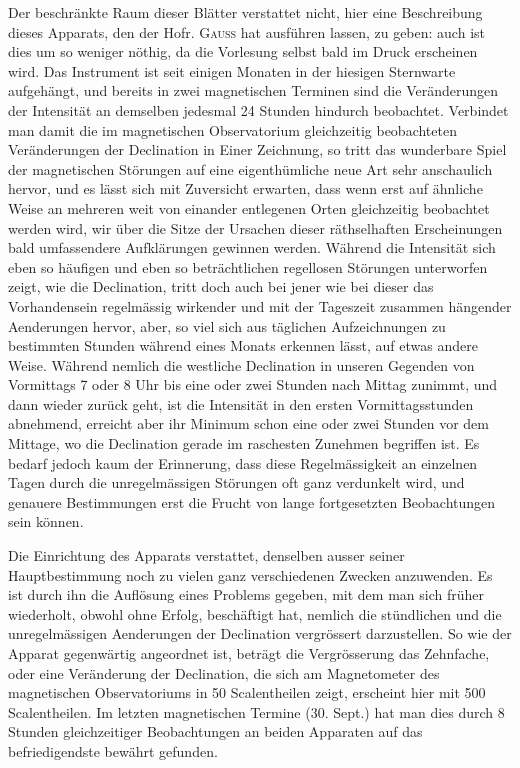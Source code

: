 Der beschränkte Raum dieser Blätter verstattet nicht, hier eine Beschreibung dieses Apparats, den der Hofr. \textsc{Gauss} hat ausführen lassen, zu geben: auch ist dies um so weniger nöthig, da die Vorlesung selbst bald im Druck erscheinen wird. Das Instrument ist seit einigen Monaten in der hiesigen Sternwarte aufgehängt, und bereits in zwei magnetischen Terminen sind die Veränderungen der Intensität an demselben jedesmal 24 Stunden hindurch beobachtet. Verbindet man damit die im magnetischen Observatorium gleichzeitig beobachteten Veränderungen der Declination in Einer Zeichnung, so tritt das wunderbare Spiel der magnetischen Störungen auf eine eigenthümliche neue Art sehr anschaulich hervor, und es lässt sich mit Zuversicht erwarten, dass wenn erst auf ähnliche Weise an mehreren weit von einander entlegenen Orten gleichzeitig beobachtet werden wird, wir über die Sitze der Ursachen dieser räthselhaften Erscheinungen bald umfassendere Aufklärungen gewinnen werden. Während die Intensität sich eben so häufigen und eben so beträchtlichen regellosen Störungen unterworfen zeigt, wie die Declination, tritt doch auch bei jener wie bei dieser das Vorhandensein regelmässig wirkender und mit der Tageszeit zusammen hängender Aenderungen hervor, aber, so viel sich aus täglichen Aufzeichnungen zu bestimmten Stunden während eines Monats erkennen lässt, auf etwas andere Weise. Während nemlich die westliche Declination in unseren Gegenden von Vormittags 7 oder 8 Uhr bis eine oder zwei Stunden nach Mittag zunimmt, und dann wieder zurück geht, ist die Intensität in den ersten Vormittagsstunden abnehmend, erreicht aber ihr Minimum schon eine oder zwei Stunden vor dem Mittage, wo die Declination gerade im raschesten Zunehmen begriffen ist. Es bedarf jedoch kaum der Erinnerung, dass diese Regelmässigkeit an einzelnen Tagen durch die unregelmässigen Störungen oft ganz verdunkelt wird, und genauere Bestimmungen erst die Frucht von lange fortgesetzten Beobachtungen sein können.

Die Einrichtung des Apparats verstattet, denselben ausser seiner Hauptbestimmung noch zu vielen ganz verschiedenen Zwecken anzuwenden. Es ist durch ihn die Auflösung eines Problems gegeben, mit dem man sich früher wiederholt, obwohl ohne Erfolg, beschäftigt hat, nemlich die stündlichen und die unregelmässigen Aenderungen der Declination vergrössert darzustellen. So wie der Apparat gegenwärtig angeordnet ist, beträgt die Vergrösserung das Zehnfache, oder eine Veränderung der Declination, die sich am Magnetometer des magnetischen Observatoriums in 50 Scalentheilen zeigt, erscheint hier mit 500 Scalentheilen. Im letzten magnetischen Termine (30. Sept.) hat man dies durch 8 Stunden gleichzeitiger Beobachtungen an beiden Apparaten auf das befriedigendste bewährt gefunden.

